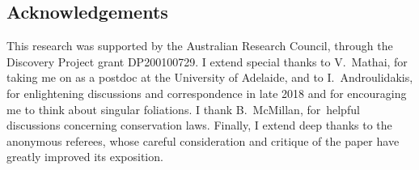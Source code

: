 \documentclass[10pt,a4paper]{amsart}
\numberwithin{equation}{section}
\begin{document}
\subsection*{Acknowledgements}

This research was supported by the Australian Research Council, through the Discovery Project grant DP200100729. I extend special thanks to V.~Mathai, for taking me on as a postdoc at the University of Adelaide, and to I.~Androulidakis, for enlightening discussions and correspondence in late 2018 and for encouraging me to think about singular foliations. I thank B.~McMillan, for~helpful discussions concerning conservation laws. Finally, I extend deep thanks to the anonymous referees, whose careful consideration and critique of the paper have greatly improved its exposition.

\end{document}
